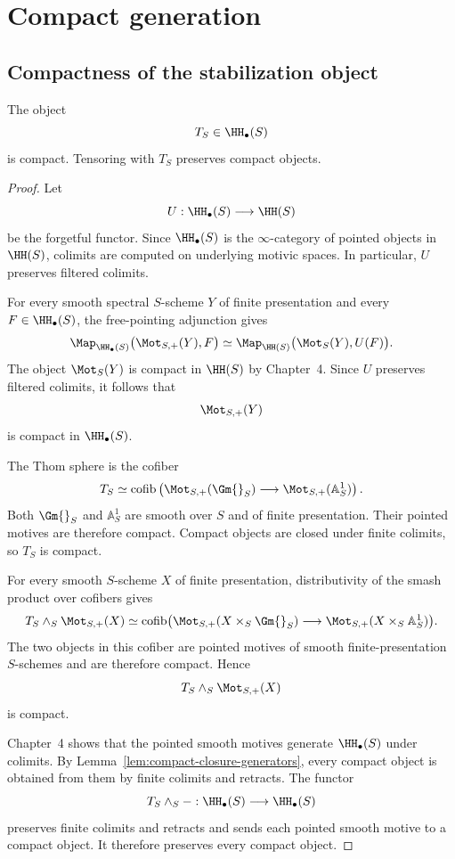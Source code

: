 \section{Compact generation}
\label{sec:SH-compact-generation}

\subsection{Compactness of the stabilization object}



\begin{proposition}[Compactness of \(T_S\)]
\label{prop:T-compact}
The object
\[
    T_S\in\HH_\bullet(S)
\]
is compact.  Tensoring with \(T_S\) preserves compact objects.
\end{proposition}

\begin{proof}
Let
\[
    U:\HH_\bullet(S)\longrightarrow\HH(S)
\]
be the forgetful functor.  Since \(\HH_\bullet(S)\) is the
\(\infty\)-category of pointed objects in \(\HH(S)\), colimits are computed
on underlying motivic spaces.  In particular, \(U\) preserves filtered
colimits.

For every smooth spectral \(S\)-scheme \(Y\) of finite presentation and every
\(F\in\HH_\bullet(S)\), the free-pointing adjunction gives
\[
    \Map_{\HH_\bullet(S)}
    \bigl(\Mot_{S,+}(Y),F\bigr)
    \simeq
    \Map_{\HH(S)}
    \bigl(\Mot_S(Y),U(F)\bigr).
\]
The object \(\Mot_S(Y)\) is compact in \(\HH(S)\) by Chapter~4.  Since \(U\)
preserves filtered colimits, it follows that
\[
    \Mot_{S,+}(Y)
\]
is compact in \(\HH_\bullet(S)\).

The Thom sphere is the cofiber
\[
    T_S
    \simeq
    \operatorname{cofib}
    \left(
      \Mot_{S,+}(\Gm{}_S)
      \longrightarrow
      \Mot_{S,+}(\mathbb A^1_S)
    \right).
\]
Both \(\Gm{}_S\) and \(\mathbb A^1_S\) are smooth over \(S\) and of finite
presentation.  Their pointed motives are therefore compact.  Compact objects
are closed under finite colimits, so \(T_S\) is compact.

For every smooth \(S\)-scheme \(X\) of finite presentation, distributivity of
the smash product over cofibers gives
\[
\begin{aligned}
    T_S\wedge_S\Mot_{S,+}(X)
    \simeq
    \operatorname{cofib}
    \bigl(
      \Mot_{S,+}(X\times_S\Gm{}_S)
      \longrightarrow
      \Mot_{S,+}(X\times_S\mathbb A^1_S)
    \bigr).
\end{aligned}
\]
The two objects in this cofiber are pointed motives of smooth
finite-presentation \(S\)-schemes and are therefore compact.  Hence
\[
    T_S\wedge_S\Mot_{S,+}(X)
\]
is compact.

Chapter~4 shows that the pointed smooth motives generate
\(\HH_\bullet(S)\) under colimits.  By
Lemma~\ref{lem:compact-closure-generators}, every compact object is obtained
from them by finite colimits and retracts.  The functor
\[
    T_S\wedge_S-:
    \HH_\bullet(S)\longrightarrow\HH_\bullet(S)
\]
preserves finite colimits and retracts and sends each pointed smooth motive to
a compact object.  It therefore preserves every compact object.
\end{proof}

